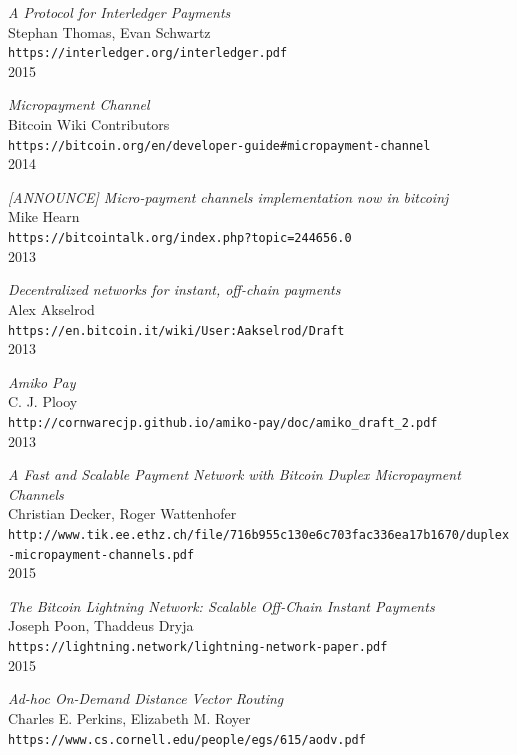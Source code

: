 \documentclass[a4paper]{article}
\begin{document}
\begin{thebibliography}{99}

  \emph{A Protocol for Interledger Payments}\\
  Stephan Thomas, Evan Schwartz\\
  \texttt{https://interledger.org/interledger.pdf}\\
  2015

  \emph{Micropayment Channel}\\
  Bitcoin Wiki Contributors\\
  \texttt{https://bitcoin.org/en/developer-guide\#micropayment-channel}\\
  2014

  \emph{[ANNOUNCE] Micro-payment channels implementation now in bitcoinj}\\
  Mike Hearn\\
  \texttt{https://bitcointalk.org/index.php?topic=244656.0}\\
  2013

  \emph{Decentralized networks for instant, off-chain payments}\\
  Alex Akselrod\\
  \texttt{https://en.bitcoin.it/wiki/User:Aakselrod/Draft}\\
  2013

  \emph{Amiko Pay}\\
  C. J. Plooy\\
  \texttt{http://cornwarecjp.github.io/amiko-pay/doc/amiko\_draft\_2.pdf}\\
  2013

  \emph{A Fast and Scalable Payment Network with Bitcoin Duplex Micropayment Channels}\\
  Christian Decker, Roger Wattenhofer\\
  \texttt{http://www.tik.ee.ethz.ch/file/716b955c130e6c703fac336ea17b1670/duplex-micropayment-channels.pdf}\\
  2015

  \emph{The Bitcoin Lightning Network: Scalable Off-Chain Instant Payments}\\
  Joseph Poon, Thaddeus Dryja\\
  \texttt{https://lightning.network/lightning-network-paper.pdf}\\
  2015

  \emph{Ad-hoc On-Demand Distance Vector Routing}\\
  Charles E. Perkins, Elizabeth M. Royer\\
  \texttt{https://www.cs.cornell.edu/people/egs/615/aodv.pdf}\\


\end{thebibliography}
\end{document}
